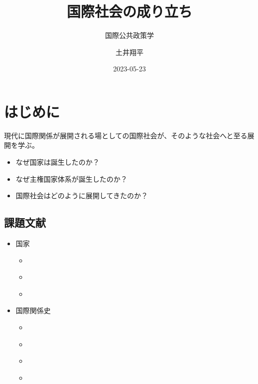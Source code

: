 \documentclass[
  xelatex,
  ja=standard]{bxjsarticle}
\title{国際社会の成り立ち}
\subtitle{国際公共政策学}
\author{土井翔平}
\date{2023-05-23}
\providecommand{\tightlist}{%
  \setlength{\itemsep}{0pt}\setlength{\parskip}{0pt}}\usepackage{longtable,booktabs,array}
\begin{document}
\maketitle
\ifdefined\Shaded\renewenvironment{Shaded}{\begin{tcolorbox}[enhanced, borderline west={3pt}{0pt}{shadecolor}, frame hidden, sharp corners, interior hidden, boxrule=0pt, breakable]}{\end{tcolorbox}}\fi

\hypertarget{ux306fux3058ux3081ux306b}{%
\section*{はじめに}\label{ux306fux3058ux3081ux306b}}

現代に国際関係が展開される場としての国際社会が、そのような社会へと至る展開を学ぶ。

\begin{itemize}
\tightlist
\item
  なぜ国家は誕生したのか？
\item
  なぜ主権国家体系が誕生したのか？
\item
  国際社会はどのように展開してきたのか？
\end{itemize}

\hypertarget{ux8ab2ux984cux6587ux732e}{%
\subsection*{課題文献}\label{ux8ab2ux984cux6587ux732e}}

\begin{itemize}
\tightlist
\item
  国家

  \begin{itemize}
  \tightlist
  \item
    \citet[第2章]{sunahara2020}
  \item
    \citet[第2章]{kubo2016}
  \item
    \citet[第1章]{kasuya2014}
  \end{itemize}
\item
  国際関係史

  \begin{itemize}
  \tightlist
  \item
    \citet[第1章 (unit 1-5)]{murata2023}
  \item
    \citet[第2章]{nakanishi2013}
  \item
    \citet{ogawa2018}
  \item
    \citet[第1-4章]{yamakage2012}
  \end{itemize}
\end{itemize}
\end{document}
